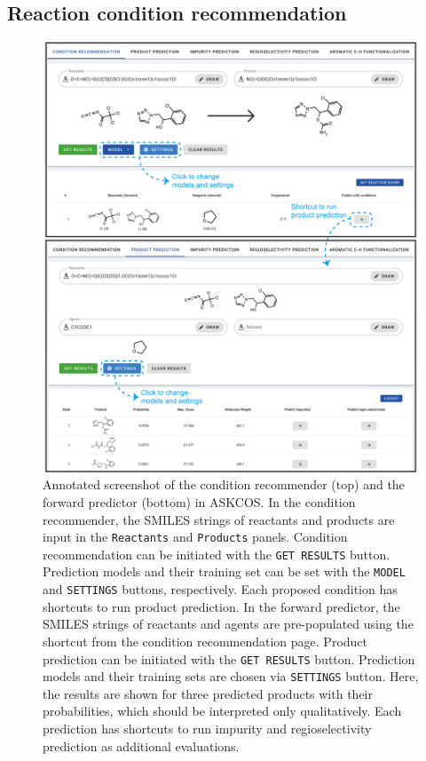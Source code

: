 \documentclass[pdflatex,sn-mathphys-num]{sn-jnl}%
\theoremstyle{thmstyleone}%
\theoremstyle{thmstyletwo}%
\theoremstyle{thmstylethree}%
\begin{document}
\subsection{Reaction condition recommendation}\label{results_condition}

\begin{figure}[h!]
\centering
\includegraphics[width=1.0\textwidth]{media/3.Forward.png}
\caption{Annotated screenshot of the condition recommender (top) and the forward predictor (bottom) in ASKCOS. In the condition recommender, the SMILES strings of reactants and products are input in the \texttt{Reactants} and \texttt{Products} panels. Condition recommendation can be initiated with the \texttt{GET RESULTS} button. Prediction models and their training set can be set with the \texttt{MODEL} and \texttt{SETTINGS} buttons, respectively. Each proposed condition has shortcuts to run product prediction. In the forward predictor, the SMILES strings of reactants and agents are pre-populated using the shortcut from the condition recommendation page. Product prediction can be initiated with the \texttt{GET RESULTS} button. Prediction models and their training sets are chosen via \texttt{SETTINGS} button. Here, the results are shown for three predicted products with their probabilities, which should be interpreted only qualitatively. Each prediction has shortcuts to run impurity and regioselectivity prediction as additional evaluations.}\label{fig_forward}
\end{figure}
\end{document}

